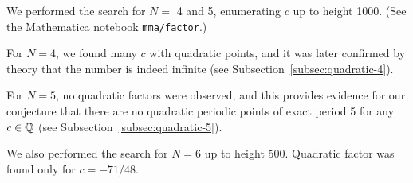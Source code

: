 We performed the search for $N =$ 4 and 5, enumerating $c$ up to
height 1000. (See the Mathematica notebook \texttt{mma/factor}.)

For $N = 4$, we found many $c$ with quadratic points, and it was later
confirmed by theory that the number is indeed infinite (see
Subsection~\ref{subsec:quadratic-4}).


For $N=5$, no quadratic factors were observed, and this provides
evidence for our conjecture that there are no quadratic periodic
points of exact period 5 for any $c \in \mathbb{Q}$ (see
Subsection~\ref{subsec:quadratic-5}).


We also performed the search for $N = 6$ up to height 500. Quadratic
factor was found only for $c = -71/48$.

